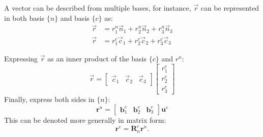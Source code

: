 \documentclass{UoNMCHA}
\numberwithin{equation}{section}
\begin{document}
A vector can be described from multiple bases, for instance, $\vec{r}$ can be represented in both basis $\{n\}$ and basis $\{c\}$ as:
\begin{equation}\label{eq:uInAandB}
	\begin{split}
		\vec{r} &= r^{n}_{1}\vec{n}_{1} + r^{n}_{2}\vec{n}_{2} + r^{n}_{3}\vec{n}_{3}\\
		\vec{r} &= r^{c}_{1}\vec{c}_{1} + r^{c}_{2}\vec{c}_{2} + r^{c}_{3}\vec{c}_{3}
	\end{split}
\end{equation}

Expressing $\vec{r}$ as an inner product of the basis $\{c\}$ and $r^{n}$:
\begin{equation}
	\vec{r} = 
	\begin{bmatrix}
		\vec{c}_{1} & \vec{c}_{2} & \vec{c}_{3}
	\end{bmatrix}
	\begin{bmatrix}
		r^{c}_{1}\\
		r^{c}_{2}\\
		r^{c}_{3}
	\end{bmatrix}
\end{equation}
Finally, express both sides in $\{n\}$:
\begin{equation}
	\mathbf{r}^{n} =
	\begin{bmatrix}
        \mathbf{b}^{c}_{1} & \mathbf{b}^{c}_{2} & \mathbf{b}^{c}_{3}
	\end{bmatrix}
	\mathbf{u}^{c}
\end{equation}
This can be denoted more generally in matrix form:
\begin{equation}
	\mathbf{r}^{c} = \mathbf{R}^{c}_{n}\mathbf{r}^{n}.
\end{equation}
\end{document}
